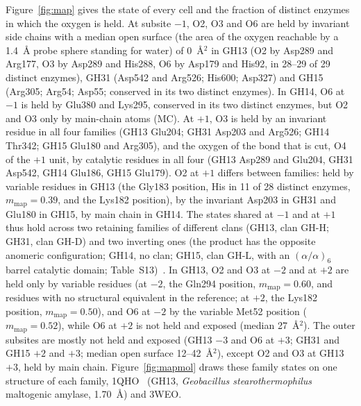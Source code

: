 \documentclass[preprint,12pt]{elsarticle}
\newcommand{\mmap}{m_\mathrm{map}}
\begin{document}
Figure~\ref{fig:map} gives the state of every cell and the fraction of distinct enzymes in which the oxygen is held.
At subsite $-1$, O2, O3 and O6 are held by invariant side chains with a median open surface (the area of the oxygen reachable by a 1.4~\AA{} probe sphere standing for water) of 0~\AA$^2$ in GH13 (O2
by Asp289 and Arg177, O3 by Asp289 and His288, O6 by Asp179 and His92, in 28--29 of 29 distinct enzymes), GH31 (Asp542 and
Arg526; His600; Asp327) and GH15 (Arg305; Arg54; Asp55; conserved in its two distinct enzymes). In GH14, O6 at $-1$ is held by
Glu380 and Lys295, conserved in its two distinct enzymes, but O2 and O3 only by main-chain atoms (MC). At $+1$, O3 is held by an invariant residue in all four families
(GH13 Glu204; GH31 Asp203 and Arg526; GH14 Thr342; GH15 Glu180 and Arg305), and the oxygen of the bond that is cut, O4 of the $+1$
unit, by catalytic residues in all four (GH13 Asp289 and Glu204, GH31 Asp542, GH14 Glu186, GH15 Glu179). O2 at $+1$
differs between families: held by variable residues in GH13 (the Gly183 position, His in 11 of 28 distinct enzymes, $\mmap =
0.39$, and the Lys182 position), by the invariant Asp203 in GH31 and Glu180 in GH15, by main chain in GH14. The states shared at $-1$ and at $+1$ thus hold across two retaining families of
different clans (GH13, clan GH-H; GH31, clan GH-D) and two inverting ones (the product has the opposite anomeric configuration; GH14, no clan; GH15, clan GH-L, with an
$(\alpha/\alpha)_6$ barrel catalytic domain; Table~S13)~\citep{Davies1995,Drula2022}. In GH13,
O2 and O3 at $-2$ and at $+2$ are held only by variable residues (at $-2$, the Gln294 position, $\mmap = 0.60$, and
residues with no structural equivalent in the reference; at $+2$, the Lys182 position, $\mmap = 0.50$), and O6 at
$-2$ by the variable Met52 position ($\mmap = 0.52$), while O6 at $+2$ is not held and exposed (median 27~\AA$^2$). The
outer subsites are mostly not held and exposed (GH13 $-3$ and O6 at $+3$; GH31 and GH15 $+2$ and $+3$; median open surface
12--42~\AA$^2$), except O2 and O3 at GH13 $+3$, held by main chain. Figure~\ref{fig:mapmol} draws these family states
on one structure of each family, 1QHO~\citep{Dauter1999} (GH13, \emph{Geobacillus stearothermophilus} maltogenic
amylase, 1.70~\AA) and 3WEO.
\end{document}
